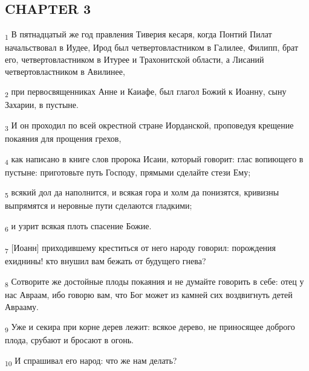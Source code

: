 \subsection{CHAPTER 3}
\begin{tcolorbox}
\textsubscript{1} В пятнадцатый же год правления Тиверия кесаря, когда Понтий Пилат начальствовал в Иудее, Ирод был четвертовластником в Галилее, Филипп, брат его, четвертовластником в Итурее и Трахонитской области, а Лисаний четвертовластником в Авилинее,
\end{tcolorbox}
\begin{tcolorbox}
\textsubscript{2} при первосвященниках Анне и Каиафе, был глагол Божий к Иоанну, сыну Захарии, в пустыне.
\end{tcolorbox}
\begin{tcolorbox}
\textsubscript{3} И он проходил по всей окрестной стране Иорданской, проповедуя крещение покаяния для прощения грехов,
\end{tcolorbox}
\begin{tcolorbox}
\textsubscript{4} как написано в книге слов пророка Исаии, который говорит: глас вопиющего в пустыне: приготовьте путь Господу, прямыми сделайте стези Ему;
\end{tcolorbox}
\begin{tcolorbox}
\textsubscript{5} всякий дол да наполнится, и всякая гора и холм да понизятся, кривизны выпрямятся и неровные пути сделаются гладкими;
\end{tcolorbox}
\begin{tcolorbox}
\textsubscript{6} и узрит всякая плоть спасение Божие.
\end{tcolorbox}
\begin{tcolorbox}
\textsubscript{7} [Иоанн] приходившему креститься от него народу говорил: порождения ехиднины! кто внушил вам бежать от будущего гнева?
\end{tcolorbox}
\begin{tcolorbox}
\textsubscript{8} Сотворите же достойные плоды покаяния и не думайте говорить в себе: отец у нас Авраам, ибо говорю вам, что Бог может из камней сих воздвигнуть детей Аврааму.
\end{tcolorbox}
\begin{tcolorbox}
\textsubscript{9} Уже и секира при корне дерев лежит: всякое дерево, не приносящее доброго плода, срубают и бросают в огонь.
\end{tcolorbox}
\begin{tcolorbox}
\textsubscript{10} И спрашивал его народ: что же нам делать?
\end{tcolorbox}

